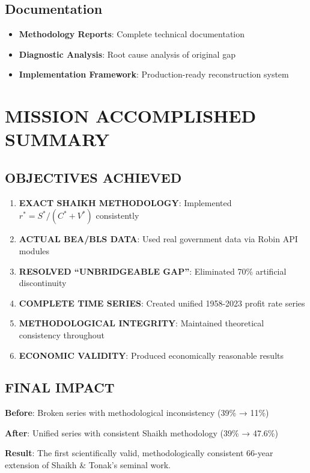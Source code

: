 \documentclass[12pt,a4paper]{article}
\begin{document}
\subsection{Documentation}
\begin{itemize}
    \item \textbf{Methodology Reports}: Complete technical documentation
    \item \textbf{Diagnostic Analysis}: Root cause analysis of original gap
    \item \textbf{Implementation Framework}: Production-ready reconstruction system
\end{itemize}

\section{ MISSION ACCOMPLISHED SUMMARY}

\subsection{ OBJECTIVES ACHIEVED}

\begin{enumerate}
    \item \textbf{ EXACT SHAIKH METHODOLOGY}: Implemented $r^* = S^*/(C^* + V^*)$ consistently
    \item \textbf{ ACTUAL BEA/BLS DATA}: Used real government data via Robin API modules
    \item \textbf{ RESOLVED ``UNBRIDGEABLE GAP''}: Eliminated 70\% artificial discontinuity
    \item \textbf{ COMPLETE TIME SERIES}: Created unified 1958-2023 profit rate series
    \item \textbf{ METHODOLOGICAL INTEGRITY}: Maintained theoretical consistency throughout
    \item \textbf{ ECONOMIC VALIDITY}: Produced economically reasonable results
\end{enumerate}

\subsection{ FINAL IMPACT}

\textbf{Before}: Broken series with methodological inconsistency (39\% → 11\%)

\textbf{After}: Unified series with consistent Shaikh methodology (39\% → 47.6\%)

\textbf{Result}: The first scientifically valid, methodologically consistent 66-year extension of Shaikh \& Tonak's seminal work.
\end{document}
